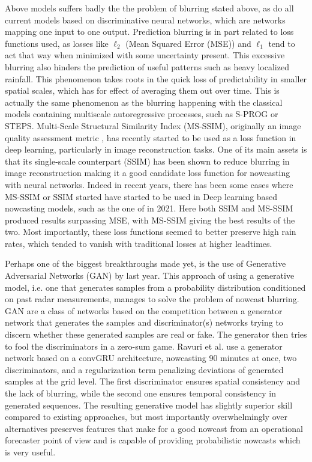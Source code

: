 Above models suffers badly the the problem of blurring stated above, as do all current models based on discriminative neural networks, which are networks mapping one input to one output. Prediction blurring is in part related to loss functions used, as losses like $\ell_2$ (Mean Squared Error (MSE)) and $\ell_1$ tend to act that way when minimized with some uncertainty present. This excessive blurring also hinders the prediction of useful patterns such as heavy localized rainfall. This phenomenon takes roots in the quick loss of predictability in smaller spatial scales, which has for effect of averaging them out over time. This is actually the same phenomenon as the blurring happening with the classical models containing multiscale autoregressive processes, such as S-PROG or STEPS. 
Multi-Scale Structural Similarity Index (MS-SSIM), originally an image quality assessment metric \cite{wang_multiscale_2003}, has recently started to be used as a loss function in deep learning, particularly in image reconstruction tasks. One of its main assets is that its single-scale counterpart (SSIM) has been shown to reduce blurring in image reconstruction \cite{zhao_loss_2017} making it a good candidate loss function for nowcasting with neural networks.  Indeed in recent years, there has been some cases where MS-SSIM or SSIM started have started to be used in Deep learning based nowcasting models, such as the one of \citet{yin_application_2021} in 2021. Here both SSIM and MS-SSIM produced results surpassing MSE, with MS-SSIM giving the best results of the two. Most importantly, these loss functions seemed to better preserve high rain rates, which tended to vanish with traditional losses at higher leadtimes. 

Perhaps one of the biggest breakthroughs made yet, is the use of Generative Adversarial Networks (GAN) by \citet{ravuri_skilful_2021} last year. This approach of using a generative model, i.e. one that generates samples from a probability distribution conditioned on past radar measurements, manages to solve the problem of nowcast blurring. GAN are a class of networks based on the competition between a generator network that generates the samples and discriminator(s) networks trying to discern whether these generated samples are real or fake. The generator then tries to fool the discriminators in a zero-sum game. Ravuri et al. use a generator network based on a convGRU architecture, nowcasting 90 minutes at once, two discriminators, and a regularization term penalizing deviations of generated samples at the grid level. The first discriminator ensures spatial consistency and the lack of blurring, while the second one ensures temporal consistency in generated sequences. The resulting generative model has slightly superior skill compared to existing approaches, but most importantly overwhelmingly over alternatives preserves features that make for a good nowcast from an operational forecaster point of view and is capable of providing probabilistic nowcasts which is very useful. \cite{ravuri_skilful_2021}

